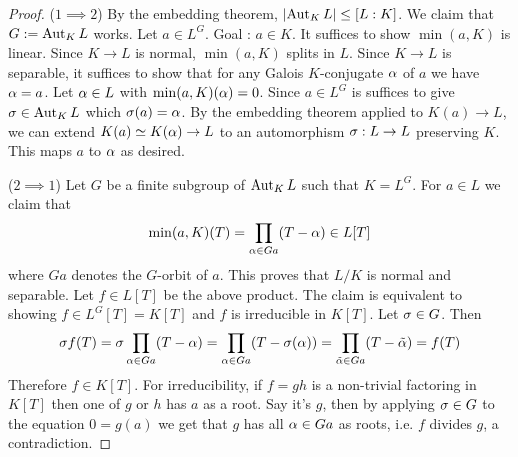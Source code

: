 \documentclass{article}
\begin{document}
\begin{proof}
  ($1 \implies 2$)
  By the embedding theorem, $\left\vert \operatorname{Aut}_K L \right\vert \leq [L : K]$.
  We claim that $G := \operatorname{Aut}_K L$ works.
  Let $a \in L^G$. Goal : $a \in K$.
  It suffices to show $\min(a , K)$ is linear.
  Since $K \to L$ is normal, $\min(a, K)$ splits in $L$.
  Since $K \to L$ is separable, it suffices to show that 
  for any Galois $K$-conjugate $\alpha$ of $a$ we have $\alpha = a$.
  Let $\alpha \in L$ with $\min(a , K)(\alpha) = 0$.
  Since $a \in L^G$ is suffices to give $\sigma \in \operatorname{Aut}_K L$
  which $\sigma(a) = \alpha$.
  By the embedding theorem applied to $K(a) \to L$,
  we can extend $K(a) \simeq K(\alpha) \to L$ to an automorphism
  $\sigma : L \to L$ preserving $K$.
  This maps $a$ to $\alpha$ as desired.

  ($2 \implies 1$) Let $G$ be a finite subgroup of $\operatorname{Aut}_K L$
  such that $K = L^G$.
  For $a \in L$ we claim that \[
    \min(a , K)(T) = \prod_{\alpha \in G a} (T - \alpha) \in L[T]
  \]
  where $G a$ denotes the $G$-orbit of $a$.
  This proves that $L/K$ is normal and separable.
  Let $f \in L[T]$ be the above product.
  The claim is equivalent to showing $f \in L^G[T] = K[T]$
  and $f$ is irreducible in $K[T]$.
  Let $\sigma \in G$. Then \[
    \sigma f (T) = \sigma \prod_{\alpha \in G a} (T - \alpha)
    = \prod_{\alpha \in G a} (T - \sigma(\alpha))
    = \prod_{\tilde{\alpha} \in G a} (T - \tilde{\alpha})
    = f(T)
  \]
  Therefore $f \in K[T]$.
  For irreducibility, if $f = g h$ is a non-trivial factoring in $K[T]$
  then one of $g$ or $h$ has $a$ as a root.
  Say it's $g$, then by applying $\sigma \in G$ to the equation $0 = g(a)$
  we get that $g$ has all $\alpha \in G a$ as roots,
  i.e. $f$ divides $g$, a contradiction.


\end{proof}
\end{document}
